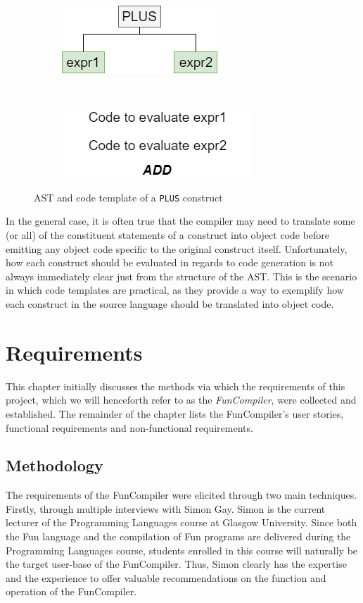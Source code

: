 \documentclass{l4proj}
\begin{document}
\begin{figure}[h]
	\centering
	\begin{subfigure}[b]{0.3\textwidth}
		\includegraphics[scale=0.65]{images/plus.png}
	\end{subfigure}
	~
	\begin{subfigure}[b]{0.3\textwidth}
		\includegraphics[scale=0.65]{images/plus-template.png}
	\end{subfigure}
	\caption{AST and code template of a \texttt{PLUS} construct}\label{fig:plus}	
\end{figure}

In the general case, it is often true that the compiler may need to translate some (or all) of the constituent statements of a construct into object code before emitting any object code specific to the original construct itself. Unfortunately, how each construct should be evaluated in regards to code generation is not always immediately clear just from the structure of the AST. This is the scenario in which code templates are practical, as they provide a way to exemplify how each construct in the source language should be translated into object code.

\chapter{Requirements}
This chapter initially discusses the methods via which the requirements of this project, which we will henceforth refer to as the \textit{FunCompiler}, were collected and established. The remainder of the chapter lists the FunCompiler's user stories, functional requirements and non-functional requirements.

\section{Methodology}
The requirements of the FunCompiler were elicited through two main techniques. Firstly, through multiple interviews with Simon Gay. Simon is the current lecturer of the Programming Languages course at Glasgow University. Since both the Fun language and the compilation of Fun programs are delivered during the Programming Languages course, students enrolled in this course will naturally be the target user-base of the FunCompiler. Thus, Simon clearly has the expertise and the experience to offer valuable recommendations on the function and operation of the FunCompiler.
\end{document}
